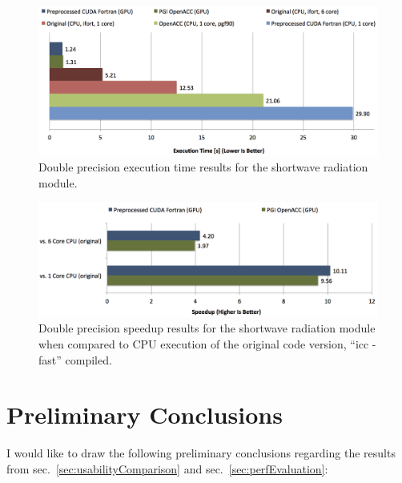 \begin{figure}[htpb]
	\centering
	\includegraphics[width=14cm]{figures/radswExecTimeResults}
	\caption[Execution Time Results for Shortwave Radiation]{Double precision execution time results for the shortwave radiation module.}
	\label{figure:radswExecTime}
\end{figure}

\begin{figure}[htpb]
	\centering
	\includegraphics[width=14cm]{figures/radswSpeedup}
	\caption[Speedup Results for Shortwave Radiation]{Double precision speedup results for the shortwave radiation module when compared to CPU execution of the original code version, ``icc -fast'' compiled.}
	\label{figure:radswSpeedup}
\end{figure}

\clearpage
\section{Preliminary Conclusions} \label{sec:evalConclusion}

I would like to draw the following preliminary conclusions regarding the results from sec.~\ref{sec:usabilityComparison} and sec.~\ref{sec:perfEvaluation}: 

